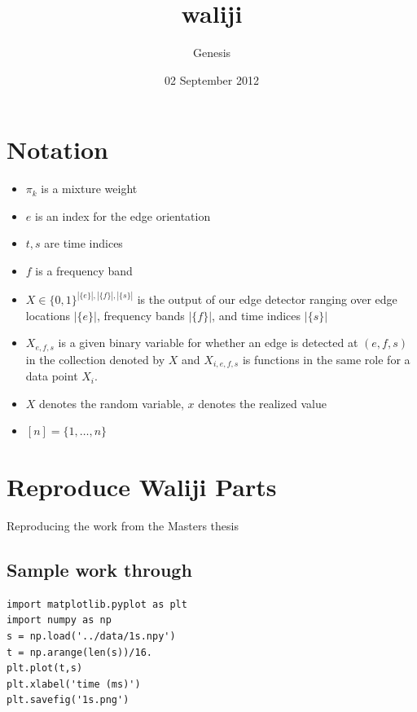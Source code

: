 \documentclass[11pt]{article}
\title{waliji}
\author{Genesis}
\date{02 September 2012}
\begin{document}
\maketitle

\setcounter{tocdepth}{3}
\tableofcontents
\vspace*{1cm}
\section{Notation}
\label{sec-1}

\begin{itemize}
\item $\pi_k$ is a mixture weight
\item $e$ is an index for the edge orientation
\item $t,s$ are time indices
\item $f$ is a frequency band
\item $X\in \{0,1\}^{|\{e\}|,|\{f\}|,|\{s\}|}$ is the output of our edge
    detector ranging over edge locations $|\{e\}|$, frequency bands
    $|\{f\}|$, and time indices $|\{s\}|$
\item $X_{e,f,s}$ is a given binary variable for whether an edge is
    detected at $(e,f,s)$ in the collection denoted by $X$ and
    $X_{i,e,f,s}$ is functions in the same role for a data point $X_i$.
\item $X$ denotes the random variable, $x$ denotes the realized value
\item $[n]=\{1,\ldots,n\}$
\end{itemize}
\section{Reproduce Waliji Parts}
\label{sec-2}

Reproducing the work from the Masters thesis
\subsection{Sample work through}
\label{sec-2.1}



\begin{verbatim}
import matplotlib.pyplot as plt
import numpy as np
s = np.load('../data/1s.npy')
t = np.arange(len(s))/16.
plt.plot(t,s)
plt.xlabel('time (ms)')
plt.savefig('1s.png')
\end{verbatim}
\end{document}
